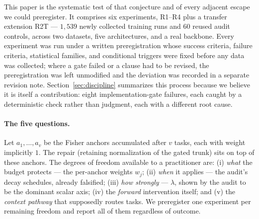 \documentclass[10pt]{article}
\begin{document}
This paper is the systematic test of that conjecture and of every adjacent
escape we could preregister. It comprises six experiments, R1--R4 plus a
transfer extension R2T --- $1{,}539$ newly collected training runs and $60$
reused audit controls, across two datasets, five architectures, and a real
backbone. Every experiment was run under a written
preregistration whose success criteria, failure criteria, statistical
families, and conditional triggers were fixed before any data was collected;
where a gate failed or a clause had to be revised, the preregistration was
left unmodified and the deviation was recorded in a separate revision note.
Section~\ref{sec:discipline} summarizes this process because we believe it
is itself a contribution: eight implementation-gate failures, each caught by a
deterministic check rather than judgment, each with a different root cause.

\paragraph{The five questions.} Let $a_1,\dots,a_v$ be the Fisher anchors
accumulated after $v$ tasks, each with weight implicitly $1$. The repair
(retaining normalization of the gated trunk) sits on top of these anchors.
The degrees of freedom available to a practitioner are: (i) \emph{what} the
budget protects --- the per-anchor weights $w_j$; (ii) \emph{when} it applies
--- the audit's decay schedules, already falsified; (iii) \emph{how strongly}
--- $\lambda$, shown by the audit to be the dominant scalar axis; (iv) the
\emph{forward} intervention itself; and (v) the \emph{context pathway} that
supposedly routes tasks. We preregister one experiment per remaining
freedom and report all of them regardless of outcome.
\end{document}
